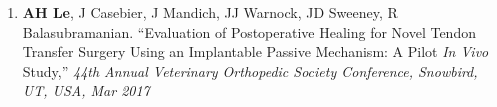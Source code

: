 \documentclass[10pt]{letter}
\begin{document}
\begin{justify}
\begin{enumerate}[leftmargin=*]
    \item \textbf{AH Le}, J Casebier, J Mandich, JJ Warnock, JD Sweeney, R Balasubramanian.
        ``Evaluation of Postoperative Healing for Novel Tendon Transfer Surgery Using an Implantable Passive Mechanism: A Pilot \textit{In Vivo} Study,''
        \textit{44th Annual Veterinary Orthopedic Society Conference, Snowbird, UT, USA, Mar 2017}
\end{enumerate}
\end{justify}
\vspace{5pt}


\end{document}

